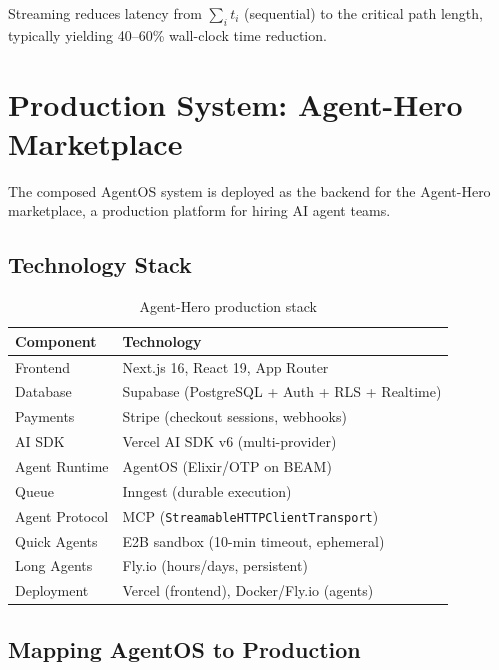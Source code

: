 \documentclass[12pt,a4paper]{article}
\theoremstyle{definition}
\begin{document}
Streaming reduces latency from $\sum_i t_i$ (sequential) to the critical
path length, typically yielding 40--60\% wall-clock time reduction.


\section{Production System: Agent-Hero Marketplace}\label{sec:production}

The composed AgentOS system is deployed as the backend for the Agent-Hero
marketplace, a production platform for hiring AI agent teams.

\subsection{Technology Stack}

\begin{table}[H]
\centering
\caption{Agent-Hero production stack}
\begin{tabular}{ll}
\toprule
\textbf{Component} & \textbf{Technology} \\
\midrule
Frontend           & Next.js 16, React 19, App Router \\
Database           & Supabase (PostgreSQL + Auth + RLS + Realtime) \\
Payments           & Stripe (checkout sessions, webhooks) \\
AI SDK             & Vercel AI SDK v6 (multi-provider) \\
Agent Runtime      & AgentOS (Elixir/OTP on BEAM) \\
Queue              & Inngest (durable execution) \\
Agent Protocol     & MCP (\texttt{StreamableHTTPClientTransport}) \\
Quick Agents       & E2B sandbox (10-min timeout, ephemeral) \\
Long Agents        & Fly.io (hours/days, persistent) \\
Deployment         & Vercel (frontend), Docker/Fly.io (agents) \\
\bottomrule
\end{tabular}
\end{table}

\subsection{Mapping AgentOS to Production}
\end{document}
